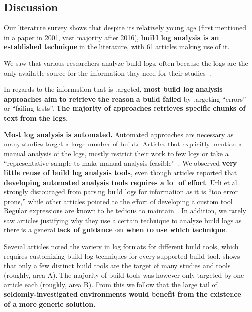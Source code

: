 \subsection{Discussion}
\label{sec:lit-sur:discussion}

Our literature survey shows that despite its relatively young age
(first mentioned in a paper in 2001, vast majority after
2016), \textbf{build log analysis is an established technique}
in the literature, with 61 articles making use of it.

We saw that various researchers analyze build logs, often because the
logs are the only available source for the
information they need for their studies~\cite{ren2018automated,
seo2014programmers,beller2017oops,zampetti2017open,rausch2017empirical}.

In regards to the information that is targeted, \textbf{most build log
analysis approaches aim to retrieve the reason a build failed} by
targeting ``errors'' or ``failing tests''.
\textbf{The majority of approaches retrieves specific chunks of
text from the logs.}

\textbf{Most log analysis is automated.} Automated approaches are
necessary as many studies target a large number of builds.
Articles
that explicitly mention a manual analysis of the logs, mostly
restrict their work to few logs or take a ``representative sample to
make manual analysis feasible''~\cite{zolfagharinia2017not}.
We observed \textbf{very little reuse of build log analysis tools},
even though articles reported that
\textbf{developing automated analysis tools requires a lot of effort}.
Urli et al.~\cite{urli2018design} strongly discouraged from parsing
build logs for information as it is ``too error prone,'' while other
articles pointed to the effort of developing a custom tool.
Regular expressions are known to be tedious to
maintain~\cite{michael2019regexes}.
In addition, we rarely saw articles justifying why they use a certain
technique to analyze build logs as there is a general \textbf{lack of
guidance on when to use which technique}.

Several articles noted the variety in log formats for different build
tools, which requires customizing build log techniques for
every supported build tool.
 shows that only a few distinct
build tools are the target of
many studies and tools (roughly, area A).
The majority of build tools was however only targeted by one
article each (roughly, area B).
From this we follow that the large tail of
\textbf{seldomly-investigated
environments would benefit from the
existence of a more generic solution.}

